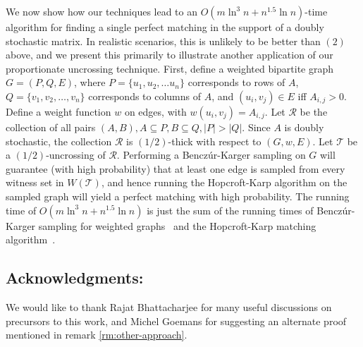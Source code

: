 \documentclass[11pt]{article}
\newcommand{\coll}{{\mathcal R}}
\newcommand{\colltwo}{{\mathcal T}}
\begin{document}
We now show how our techniques lead to an $O(m\ln^3 n + n^{1.5}\ln n)$-time
algorithm for finding a single perfect matching in the support of a doubly
stochastic matrix. In realistic scenarios, this is unlikely to be better than
$(2)$ above, and we present this primarily to illustrate another application
of our proportionate uncrossing technique. First, define a weighted bipartite
graph $G=(P,Q,E)$, where $P=\{u_1, u_2, \ldots u_n\}$ corresponds to rows of
$A$, $Q = \{v_1, v_2, \ldots,v_n\}$ corresponds to columns of $A$, and
$(u_i,v_j)\in E$ iff $A_{i,j} > 0$. Define a weight function $w$ on edges,
with $w(u_i,v_j) = A_{i,j}$. Let $\coll$ be the collection of all pairs
$(A,B), A\subseteq P, B\subseteq Q, |P| > |Q|$. Since $A$ is doubly
stochastic, the collection $\coll$ is $(1/2)$-thick with respect to $(G, w,
E)$. Let $\colltwo$ be a $(1/2)$-uncrossing of $\coll$. Performing a
Bencz\'{u}r-Karger sampling on $G$ will guarantee (with high probability) that at
least one edge is sampled from every witness set in $W(\colltwo)$, and hence
running the Hopcroft-Karp algorithm on the sampled graph will yield a perfect
matching with high probability. The running time of $O(m\ln^3 n + n^{1.5}\ln
n)$ is just the sum of the running times of Bencz\'{u}r-Karger sampling for
weighted graphs~\cite{benczurkarger96} and the Hopcroft-Karp matching
algorithm~\cite{hk:match73}.

\newpage
\subsection*{Acknowledgments:} We would like to thank Rajat Bhattacharjee for many useful discussions on precursors to this work, and Michel Goemans for suggesting an alternate proof mentioned in remark \ref{rm:other-approach}.
\end{document}
